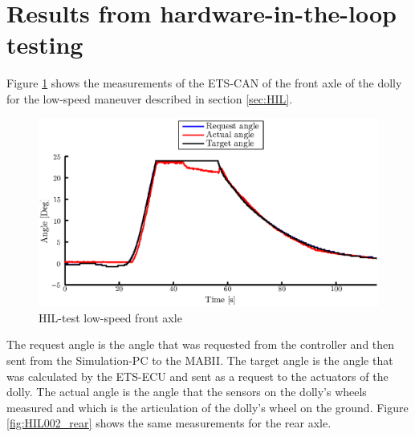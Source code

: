 \documentclass[ExampleMasters.tex]{subfiles}
\begin{document}






\section{Results from hardware-in-the-loop testing}

Figure \ref{fig:HIL002_front} shows the measurements of the ETS-CAN of the front axle of the dolly for the low-speed maneuver described in section \ref{sec:HIL}.\\

\begin{figure}[!htb]
	\centering
	\includegraphics[width=1\linewidth]{figures/HIL002_front}
	\caption{\acrlong{HIL}-test low-speed front axle}
	
	\label{fig:HIL002_front}
\end{figure}

The request angle is the angle that was requested from the controller and then sent from the Simulation-PC to the \gls{MABII}. The target angle is the angle that was calculated by the \gls{ETS}-\gls{ECU} and sent as a request to the actuators of the dolly. The actual angle is the angle that the sensors on the dolly's wheels measured and which is the articulation of the dolly's wheel on the ground.
Figure \ref{fig:HIL002_rear} shows the same measurements for the rear axle.
\end{document}
